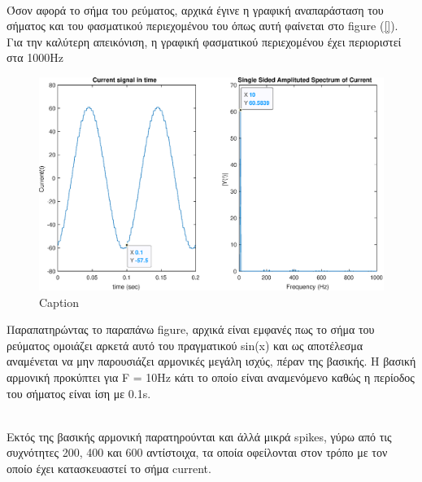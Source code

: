 \clearpage
\noindent\\
Όσον αφορά το σήμα του ρεύματος, αρχικά έγινε η γραφική αναπαράσταση του σήματος και του φασματικού περιεχομένου του όπως αυτή φαίνεται στο figure (\ref{}). Για την καλύτερη απεικόνιση, η γραφική φασματικού περιεχομένου έχει περιοριστεί στα 1000Ηz

\begin{figure}[h]
    \centering
    \includegraphics[width=.8\textwidth]{Images/current_Q3.eps}
    \caption{Caption}
    \label{fig:my_label}
\end{figure}

\noindent
Παραπατηρώντας το παραπάνω figure, αρχικά είναι εμφανές πως το σήμα του ρεύματος ομοιάζει αρκετά αυτό του πραγματικού sin(x) και ως αποτέλεσμα αναμένεται να μην παρουσιάζει αρμονικές μεγάλη ισχύς, πέραν της βασικής. Η βασική αρμονική προκύπτει για F = 10Hz κάτι το οποίο είναι αναμενόμενο καθώς η περίοδος του σήματος είναι ίση με 0.1s.

\noindent\\
Εκτός της βασικής αρμονική παρατηρούνται και άλλά μικρά spikes, γύρω από τις συχνότητες 200, 400 και 600 αντίστοιχα, τα οποία οφείλονται στον τρόπο με τον οποίο έχει κατασκευαστεί το σήμα current.